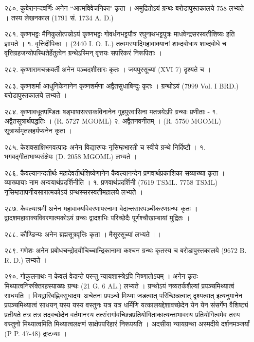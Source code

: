 २८०. कुबेरानन्दवर्णिः 
अनेन ``आत्मविवेचनिका" कृता । अमुद्रितोऽयं ग्रन्थः बरोडापुस्तकालये 758 लभ्यते । तस्य लेखनकाल (1791 सं. 1734 A. D.)

२८१. कृष्णभट्टः
मैनिकुलोत्पन्नोऽयं कृष्णभट्टः गोवर्धनभट्टपौत्र रघुनाथभट्टपुत्रः माधवेन्द्रसरस्वतीशिष्यः इति ज्ञायते ।
१. वृत्तिदीपिका । (2440 I. O. L.) तत्वमस्यादिमहावाक्यानां शाब्दबोधाय शाब्दबोधे च वृत्तिग्रहजन्योपस्थितेर्हेतुत्वेन ग्रन्थेऽस्मिन् वृत्तयः सपरिकरं निरूपिताः ।

२८२. कृष्णारामचक्रवर्ती
अनेन पञ्चदशीसारः कृतः । जयपुरसूच्यां (XVI 7) दृश्यते च ।

२८३. कृष्णशर्मा 
आधुनिकेनानेन कृष्णशर्मणा अद्वैतसुधाबिन्दुः कृतः । ग्रन्थोऽयं (7999 Vol. I BRD.) बरोडापुस्तकालये लभ्यते ।

२८४. कृष्णावधूतपण्डितः
षड्भाषासरसकविनानेन गुहपुरवासिना मतत्रयेऽपि ग्रन्थाः प्रणीताः -
१. अद्वैतसूत्रार्थपद्धतिः । (R. 5727 MGOML)
२. अद्वैतनवनीतम् । (R. 5750 MGOML) सूत्रार्थामृतलहर्यप्यनेन कृता ।

२८५. केशवसाक्षिभगवत्पादः 
अनेन विद्यारण्यः नृसिम्हभारती च स्वीये ग्रन्थे निर्दिष्टौ ।
१. भगवद्गीताभाष्यसंक्षेपः (D. 2058 MGOML) लभ्यते ।

२८६. कैवल्यानन्दतीर्थः
महादेवतीर्थशिष्येणानेन कैवल्यानन्देन प्रणवार्थप्रकाशिका सव्याख्या कृता । व्याख्यायाः नाम अन्वयार्थप्रदर्शिनीति ।
१. प्रणवार्थप्रदर्शिनी (7619 TSML. 7758 TSML) नृसिम्हतापनीयसारात्मकोऽयं ग्रन्थस्सरस्वतीमहालये लभ्यते ।

२८७. कैवल्याश्रमी 
अनेन महावाक्यविवरणापरनामा वेदान्तसारपञ्चीकरणग्रन्थः कृतः । द्वादशमहावाक्यविवरणात्मकोऽयं ग्रन्थः द्वादशभिः परिच्छेदैः पूर्णश्चौखाम्बायां मुद्रितः ।

२८८. कौण्डिन्यः 
अनेन ब्रह्मसूत्रवृत्तिः कृता । मैसूरसूच्यां लभ्यते ।।

२८९. गणेशः
अनेन प्रबोधचन्द्रोदयीचिच्चान्द्रिकानामा कश्चन ग्रन्थः कृतस्य च बरोडापुस्तकालये (9672 B. R. D.) लभ्यते ।

२९०. गोकुलनाथः
न केवलं वेदान्ते परन्तु न्यायशास्त्रेऽपि निष्णातोऽयम् । अनेन कृतः मिथ्यात्वनिरुक्तिरहस्याख्यः ग्रन्थः (21 G. 6 AL.) लभ्यते । ग्रन्थोऽयं नव्यतर्कशैल्यां प्रपञ्चमिथ्यात्वं साधयति । वियद्वारिबह्निवसुधादयः अचेतनः प्रपञ्चो मिथ्या जडत्वात् परिच्छिन्नत्वात् दृश्यत्वात् इत्यनुमानेन प्रपञ्चमिथ्यात्वं साधयन् यस्य यस्य वस्तुनः यत्र यत्र धर्मिणि यत्कालयद्देशावच्छेदेन येन येन संसर्गेण वैशिष्ट्यं प्रतीयते तत्र तत्र तदवच्छेदेन वर्तमानस्य तत्संसर्गावच्छिन्नप्रतियोगिताकात्यन्ताभावस्य प्रतियोगित्वमेव तस्य वस्तुनो मिथ्यात्वमिति मिथ्यात्वलक्षणं साक्षेपपरिहारं निरूपयति । अदसीया न्यायग्रन्था अस्मदीये दर्शनमञ्जर्यां (P P. 47-48) द्रष्टव्याः ।

